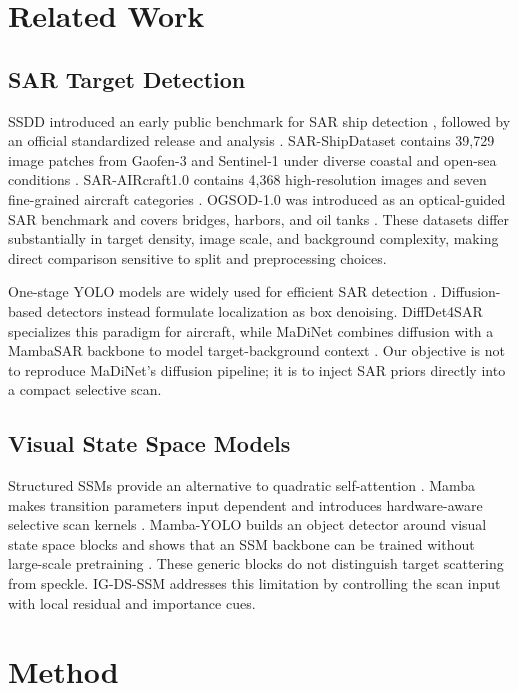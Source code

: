 \documentclass[letterpaper]{article}
\newcommand{\method}{IG-DS-SSM}
\begin{document}
\section{Related Work}

\subsection{SAR Target Detection}

SSDD introduced an early public benchmark for SAR ship detection \citep{ssdd2017}, followed by an official standardized release and analysis \citep{ssddofficial}. SAR-ShipDataset contains 39,729 image patches from Gaofen-3 and Sentinel-1 under diverse coastal and open-sea conditions \citep{sarshipdataset}. SAR-AIRcraft1.0 contains 4,368 high-resolution images and seven fine-grained aircraft categories \citep{saraircraft}. OGSOD-1.0 was introduced as an optical-guided SAR benchmark and covers bridges, harbors, and oil tanks \citep{ogsod}. These datasets differ substantially in target density, image scale, and background complexity, making direct comparison sensitive to split and preprocessing choices.

One-stage YOLO models are widely used for efficient SAR detection \citep{yolov5,yolov8}. Diffusion-based detectors instead formulate localization as box denoising. DiffDet4SAR specializes this paradigm for aircraft, while MaDiNet combines diffusion with a MambaSAR backbone to model target-background context \citep{diffdet4sar,madinet}. Our objective is not to reproduce MaDiNet's diffusion pipeline; it is to inject SAR priors directly into a compact selective scan.

\subsection{Visual State Space Models}

Structured SSMs provide an alternative to quadratic self-attention \citep{s4}. Mamba makes transition parameters input dependent and introduces hardware-aware selective scan kernels \citep{mamba}. Mamba-YOLO builds an object detector around visual state space blocks and shows that an SSM backbone can be trained without large-scale pretraining \citep{mambayolo}. These generic blocks do not distinguish target scattering from speckle. \method{} addresses this limitation by controlling the scan input with local residual and importance cues.

\section{Method}
\end{document}
